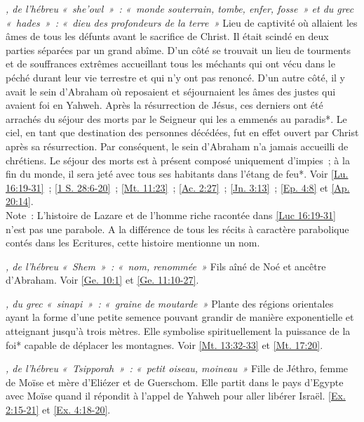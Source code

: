 \begin{multicols}{2}
\textit{, de l'hébreu «~she'owl~»~: «~monde souterrain, tombe, enfer, fosse~» et du grec «~hades~»~: «~dieu des profondeurs de la terre~»}\newline
Lieu de captivité où allaient les âmes de tous les défunts avant le sacrifice de Christ. Il était scindé en deux parties séparées par un grand abîme. D'un côté se trouvait un lieu de tourments et de souffrances extrêmes accueillant tous les méchants qui ont vécu dans le péché durant leur vie terrestre et qui n'y ont pas renoncé. D'un autre côté, il y avait le sein d'Abraham où reposaient et séjournaient les âmes des justes qui avaient foi en Yahweh. Après la résurrection de Jésus, ces derniers ont été arrachés du séjour des morts par le Seigneur qui les a emmenés au paradis*. Le ciel, en tant que destination des personnes décédées, fut en effet ouvert par Christ après sa résurrection. Par conséquent, le sein d'Abraham n'a jamais accueilli de chrétiens. Le séjour des morts est à présent composé uniquement d'impies~; à la fin du monde, il sera jeté avec tous ses habitants dans l'étang de feu*. Voir \vref{Lu. 16:19-31}~; \vref{1 S. 28:6-20}~; \vref{Mt. 11:23}~; \vref{Ac. 2:27}~; \vref{Jn. 3:13}~; \vref{Ep. 4:8} et \vref{Ap. 20:14}.
\\Note~: L'histoire de Lazare et de l'homme riche racontée dans \vref{Luc 16:19-31} n'est pas une parabole. A la différence de tous les récits à caractère parabolique contés dans les Ecritures, cette histoire mentionne un nom.

\textit{, de l'hébreu «~Shem~»~: «~nom, renommée~»}\newline
Fils aîné de Noé et ancêtre d'Abraham. Voir \vref{Ge. 10:1} et \vref{Ge. 11:10-27}.

\textit{, du grec «~sinapi~»~: «~graine de moutarde~»}\newline
Plante des régions orientales ayant la forme d'une petite semence pouvant grandir de manière exponentielle et atteignant jusqu'à trois mètres. Elle symbolise spirituellement la puissance de la foi* capable de déplacer les montagnes. Voir \vref{Mt. 13:32-33} et \vref{Mt. 17:20}.

\textit{, de l'hébreu «~Tsipporah~»~: «~petit oiseau, moineau~»}\newline
Fille de Jéthro, femme de Moïse et mère d'Eliézer et de Guerschom. Elle partit dans le pays d'Egypte avec Moïse quand il répondit à l'appel de Yahweh pour aller libérer Israël. \vref{Ex. 2:15-21} et \vref{Ex. 4:18-20}.


\end{multicols}
